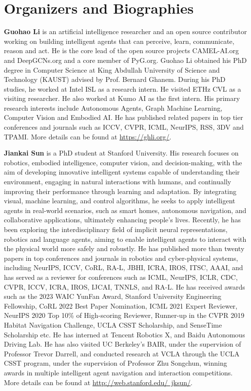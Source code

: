 \documentclass[10pt]{article} %
\begin{document}
\section{Organizers and Biographies}
\textbf{Guohao Li} is an artificial intelligence researcher and an open source contributor working on building intelligent agents that can perceive, learn, communicate, reason and act. He is the core lead of the open source projects CAMEL-AI.org and DeepGCNs.org and a core member of PyG.org. Guohao Li obtained his PhD degree in Computer Science at King Abdullah University of Science and Technology (KAUST) advised by Prof. Bernard Ghanem. During his PhD studies, he worked at Intel ISL as a research intern. He visited ETHz CVL as a visiting researcher. He also worked at Kumo AI as the first intern. His primary research interests include Autonomous Agents, Graph Machine Learning, Computer Vision and Embodied AI. He has published related papers in top tier conferences and journals such as ICCV, CVPR, ICML, NeurIPS, RSS, 3DV and TPAMI. More details can be found at \href{https://ghli.org/}{https://ghli.org/}.


\textbf{Jiankai Sun} is a PhD student at Stanford University. His research focuses on robotics, embodied intelligence, computer vision, and decision-making, with the aim of developing innovative intelligent systems capable of understanding their environment, engaging in natural interactions with humans, and continually improving their performance through learning and adaptation. By integrating visual, machine learning, and control algorithms, he seeks to apply intelligent agents in real-world scenarios, such as smart homes, autonomous navigation, and collaborative applications, ultimately enhancing people's lives. Recently, he has been exploring the interdisciplinary field of implicit neural representations, robotics and language agents, aiming to enable intelligent agents to interact with the physical world more safely and robustly. He has published more than twenty papers in top conferences and journals in robotics and cyber-physical systems, including NeurIPS, ICCV, CoRL, RA-L, JBHI, ICRA, IROS, ITSC, AAAI, and has served as a reviewer for conferences such as ICML, NeurIPS, ICLR, CDC, CVPR, ICCV, ICRA, IROS, IJCAI, TNNLS, and RA-L. He has received awards such as the 2023 WAIC YunFan Award, Stanford University Engineering Fellowship, CoRL 2022 Best Paper Nomination, ICML 2021 Expert Reviewer, NeurIPS 2020 Top 10\% of High-scoring Reviewer, Runner-up in the CVPR 2019 Habitat Navigation Challenge, UCLA CSST Scholarship, and SenseTime Scholarship etc. He has interned at Tencent Robotics X, and Baidu Autonomous Driving Lab. He has also visited UC Berkeley's BAIR, under the supervision of Professor Trevor Darrell, and conducted research at VCLA through the UCLA CSST program, under the supervision of Professor Zhu Songchun, winning awards in multiple intelligent agent navigation and interaction competitions. More details can be found at \href{http://web.stanford.edu/~jksun/}{http://web.stanford.edu/~jksun/}. 
\end{document}
